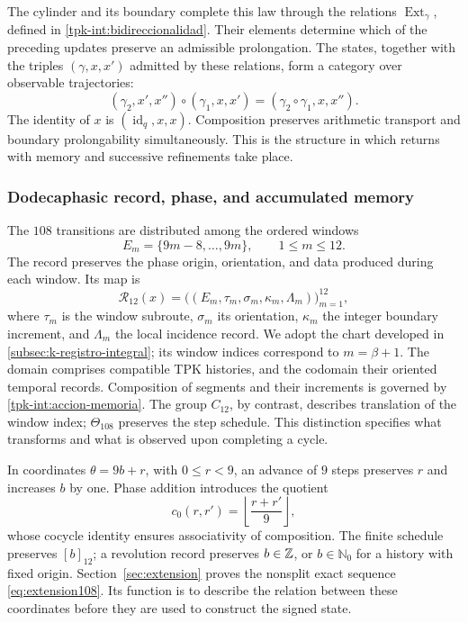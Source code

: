 The cylinder and its boundary complete this law through the relations
\(\operatorname{Ext}_\gamma\), defined in
\ref{tpk-int:bidireccionalidad}. Their elements determine which of
the preceding updates preserve an admissible prolongation.
The states, together with the triples \((\gamma,x,x')\) admitted by
these relations, form a category over observable trajectories:
\[
 (\gamma_2,x',x'')\circ(\gamma_1,x,x')
     =(\gamma_2\circ\gamma_1,x,x'').
\]
The identity of \(x\) is \((\operatorname{id}_q,x,x)\).
Composition preserves arithmetic transport and boundary
prolongability simultaneously. This is the structure in which returns
with memory and successive refinements take place.

\subsubsection{Dodecaphasic record, phase, and accumulated memory}
\label{tpk-int:dodecafase}

The \(108\) transitions are distributed among the ordered windows
\[
 E_m=\{9m-8,\ldots,9m\},\qquad 1\leq m\leq12.
\]
The record preserves the phase origin, orientation, and data
produced during each window. Its map is
\[
 \mathcal R_{12}(x)=
 \bigl((E_m,\tau_m,\sigma_m,\kappa_m,\Lambda_m)\bigr)_{m=1}^{12},
\]
where \(\tau_m\) is the window subroute, \(\sigma_m\) its
orientation, \(\kappa_m\) the integer boundary increment, and
\(\Lambda_m\) the local incidence record. We adopt the chart
developed in \ref{subsec:k-registro-integral}; its window indices
correspond to \(m=\beta+1\).
The domain comprises compatible TPK histories,
and the codomain their oriented temporal records.
Composition of segments and their increments is governed by
\eqref{tpk-int:accion-memoria}. The group \(C_{12}\), by
contrast, describes translation of the window index; \(\Theta_{108}\) preserves
the step schedule. This distinction specifies what transforms
and what is observed upon completing a cycle.

In coordinates \(\theta=9b+r\), with \(0\leq r<9\), an advance
of \(9\) steps preserves \(r\) and increases \(b\) by one.
Phase addition introduces the quotient
\[
 c_0(r,r')=\left\lfloor\frac{r+r'}9\right\rfloor,
\]
whose cocycle identity ensures associativity of composition.
The finite schedule preserves \([b]_{12}\); a revolution record
preserves \(b\in\mathbb Z\), or \(b\in\mathbb N_0\) for
a history with fixed origin. Section~\ref{sec:extension} proves
the nonsplit exact sequence \eqref{eq:extension108}. Its function is
to describe the relation between these coordinates before they are used to
construct the signed state.

